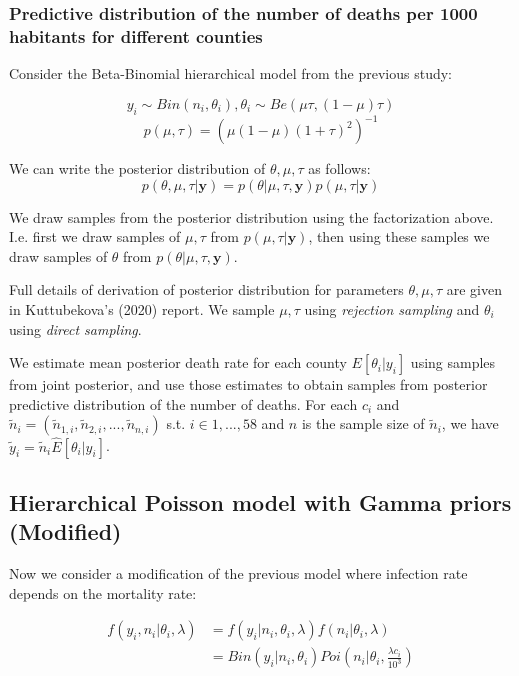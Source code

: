 \documentclass[11pt,twocolumn]{asaproc}
\begin{document}
\subsubsection{Predictive distribution of the number of deaths per 1000 habitants for different counties}

Consider the Beta-Binomial hierarchical model from the previous study:

$$y_i \sim Bin(n_i, \theta_i), \theta_i \sim Be(\mu\tau, (1-\mu)\tau)$$ $$p(\mu, \tau) = (\mu(1-\mu)(1+\tau)^2)^{-1}$$ 

We can write the posterior distribution of $\theta, \mu, \tau$ as follows: $$p(\theta, \mu, \tau | \mathbf{y}) = p(\theta|\mu, \tau,  \mathbf{y})p(\mu, \tau | \mathbf{y})$$

We draw samples from the posterior distribution using the factorization above. I.e. first we draw samples of $\mu, \tau$ from $p(\mu, \tau |  \mathbf{y})$, then using these samples we draw samples of $\theta$ from $p(\theta | \mu, \tau, \mathbf{y})$.  

Full details of derivation of posterior distribution for parameters $\theta, \mu, \tau$ are given in Kuttubekova's (2020) report. We sample $\mu, \tau$ using \textit{rejection sampling} and $\theta_i$ using \textit{direct sampling}. 

We estimate mean posterior death rate for each county $E[\theta_i |y_i]$ using samples from joint posterior, and use those estimates to obtain samples from posterior predictive distribution of the number of deaths. For each $c_i$ and $\tilde{n}_i = (\tilde{n}_{1,i}, \tilde{n}_{2,i}, ..., \tilde{n}_{n,i})$ s.t. $i \in {1, ..., 58}$ and $n$ is the sample size of $\tilde{n}_i$, we have $\tilde{y}_i = \tilde{n}_i \hat{E}[\theta_i |y_i] $. 










\subsection{Hierarchical Poisson model with Gamma priors (Modified)}
Now we consider a modification of the previous model where infection rate depends on the mortality rate:

\begin{align*}
f(y_i, n_i|\theta_i, \lambda) & = f(y_i|n_i, \theta_i, \lambda)f(n_i|\theta_i, \lambda) \\
& = Bin(y_i|n_i, \theta_i)Poi(n_i|\theta_i, \frac{\lambda c_i}{10^3})
\end{align*}
\end{document}
